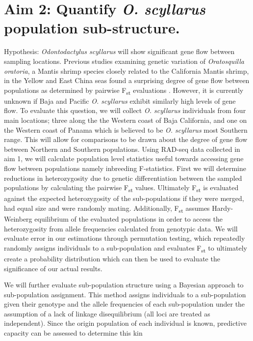 \documentclass[11pt]{article}
\begin{document}
\section*{Aim 2: Quantify \emph{O. scyllarus} population sub-structure.}
Hypothesis: \emph{Odontodactylus scyllarus} will show significant gene flow between sampling locations. Previous studies examining genetic variation of \emph{Oratosquilla oratoria}, a Mantis shrimp species closely related to the California Mantis shrimp, in the Yellow and East China seas found a surprising degree of gene flow between populations as determined by pairwise F\textsubscript{st} evaluations \cite{Yang2018}. However, it is currently unknown if Baja and Pacific \emph{O. scyllarus} exhibit similarly high levels of gene flow. To evaluate this question, we will collect \emph{O. scyllarus} individuals from four main locations; three along the the Western coast of Baja California, and one on the Western coast of Panama which is believed to be \emph{O. scyllarus} most Southern range. This will allow for comparisons to be drawn about the degree of gene flow between Northern and Southern populations. Using RAD-seq data collected in aim 1, we will calculate population level statistics useful towards accessing gene flow between populations namely inbreeding F-statistics. First we will determine reductions in heterozygosity due to genetic differentiation between the sampled populations by calculating the pairwise F\textsubscript{st} values. Ultimately F\textsubscript{st} is evaluated against the expected heterozygosity of the sub-populations if they were merged, had equal size and were randomly mating. Additionally, F\textsubscript{st} assumes Hardy-Weinberg equilibrium of the evaluated populations in order to access the heterozygosity from allele frequencies calculated from genotypic data. We will evaluate error in our estimations through permutation testing, which repeatedly randomly assigns individuals to a sub-population and evaluates  F\textsubscript{st} to ultimately create a probability distribution which can then be used to evaluate the significance of our actual results. 

We will further evaluate sub-population structure using a Bayesian approach to sub-population assignment. This method assigns individuals to a sub-population given their genotype and the allele frequencies of each sub-population under the assumption of a lack of linkage disequilibrium (all loci are treated as independent). Since the origin population of each individual is known, predictive capacity can be assessed to determine this kin
\end{document}
